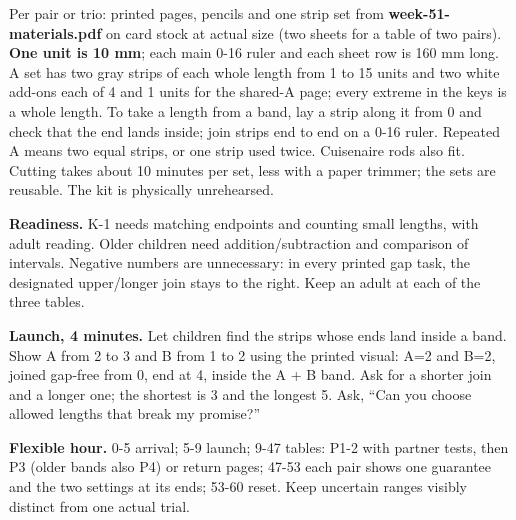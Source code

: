 Per pair or trio: printed pages, pencils and one strip set from \textbf{week-51-materials.pdf} on card stock at actual size (two sheets for a table of two pairs). \textbf{One unit is 10 mm}; each main 0-16 ruler and each sheet row is 160 mm long. A set has two gray strips of each whole length from 1 to 15 units and two white add-ons each of 4 and 1 units for the shared-A page; every extreme in the keys is a whole length. To take a length from a band, lay a strip along it from 0 and check that the end lands inside; join strips end to end on a 0-16 ruler. Repeated A means two equal strips, or one strip used twice. Cuisenaire rods also fit. Cutting takes about 10 minutes per set, less with a paper trimmer; the sets are reusable. The kit is physically unrehearsed.

\textbf{Readiness.} K-1 needs matching endpoints and counting small lengths, with adult reading. Older children need addition/subtraction and comparison of intervals. Negative numbers are unnecessary: in every printed gap task, the designated upper/longer join stays to the right. Keep an adult at each of the three tables.

\textbf{Launch, 4 minutes.} Let children find the strips whose ends land inside a band. Show A from 2 to 3 and B from 1 to 2 using the printed visual: A=2 and B=2, joined gap-free from 0, end at 4, inside the A + B band. Ask for a shorter join and a longer one; the shortest is 3 and the longest 5. Ask, ``Can you choose allowed lengths that break my promise?''

\textbf{Flexible hour.} 0-5 arrival; 5-9 launch; 9-47 tables: P1-2 with partner tests, then P3 (older bands also P4) or return pages; 47-53 each pair shows one guarantee and the two settings at its ends; 53-60 reset. Keep uncertain ranges visibly distinct from one actual trial.
